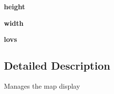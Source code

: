 \begin{DoxyCompactItemize}
\item 
\hypertarget{classinterface_1_1cursescli_1_1_map_view_a89ce02532a85956e4ed40d542a8dee05}{{\bfseries height}}\label{classinterface_1_1cursescli_1_1_map_view_a89ce02532a85956e4ed40d542a8dee05}

\item 
\hypertarget{classinterface_1_1cursescli_1_1_map_view_a43149a1b807de32ab262bd356955b842}{{\bfseries width}}\label{classinterface_1_1cursescli_1_1_map_view_a43149a1b807de32ab262bd356955b842}

\item 
\hypertarget{classinterface_1_1cursescli_1_1_map_view_ae22ec0cc3de12de2abc3df53b4838b27}{{\bfseries lovs}}\label{classinterface_1_1cursescli_1_1_map_view_ae22ec0cc3de12de2abc3df53b4838b27}

\end{DoxyCompactItemize}


\subsection{\-Detailed \-Description}
\begin{DoxyVerb}Manages the map display \end{DoxyVerb}
 

